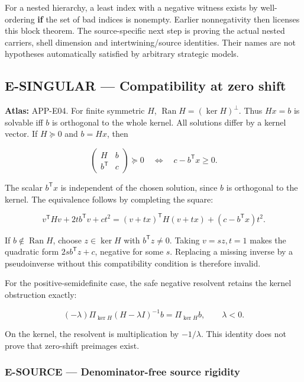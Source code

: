 \documentclass[
  11pt,
  a4paper,
]{article}
\begin{document}
For a nested hierarchy, a least index with a negative witness exists by
well-ordering \textbf{if} the set of bad indices is nonempty. Earlier
nonnegativity then licenses this block theorem. The source-specific next
step is proving the actual nested carriers, shell dimension and
intertwining/source identities. Their names are not hypotheses
automatically satisfied by arbitrary strategic models.

\subsection{E-SINGULAR --- Compatibility at zero
shift}\label{e-singular-compatibility-at-zero-shift}

\textbf{Atlas:} APP-E04. For finite symmetric \(H\),
\(\operatorname{Ran}H=(\ker H)^\perp\). Thus \(Hx=b\) is solvable iff
\(b\) is orthogonal to the whole kernel. All solutions differ by a
kernel vector. If \(H\succeq0\) and \(b=Hx\), then

\[\begin{pmatrix}H&b\\b^{\mathsf T}&c\end{pmatrix}\succeq0
\quad\Longleftrightarrow\quad c-b^{\mathsf T}x\ge0.\]

The scalar \(b^{\mathsf T}x\) is independent of the chosen solution,
since \(b\) is orthogonal to the kernel. The equivalence follows by
completing the square:

\[v^{\mathsf T}Hv+2t b^{\mathsf T}v+ct^2
=(v+tx)^{\mathsf T}H(v+tx)+(c-b^{\mathsf T}x)t^2.\]

If \(b\notin\operatorname{Ran}H\), choose \(z\in\ker H\) with
\(b^{\mathsf T}z\ne0\). Taking \(v=sz,t=1\) makes the quadratic form
\(2s b^{\mathsf T}z+c\), negative for some \(s\). Replacing a missing
inverse by a pseudoinverse without this compatibility condition is
therefore invalid.

For the positive-semidefinite case, the safe negative resolvent retains
the kernel obstruction exactly:

\[(-\lambda)\Pi_{\ker H}(H-\lambda I)^{-1}b=\Pi_{\ker H}b,
\qquad\lambda<0.\]

On the kernel, the resolvent is multiplication by \(-1/\lambda\). This
identity does not prove that zero-shift preimages exist.

\subsubsection{E-SOURCE --- Denominator-free source
rigidity}\label{e-source-denominator-free-source-rigidity}
\end{document}
